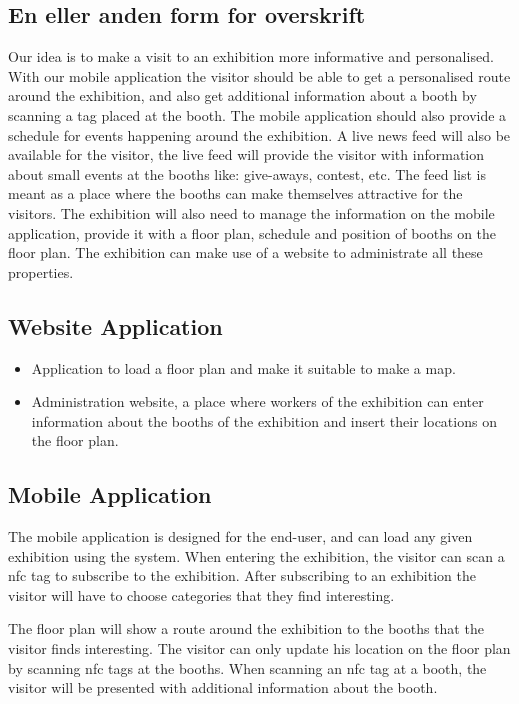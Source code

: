 \subsection*{En eller anden form for overskrift}

Our idea is to make a visit to an exhibition more informative and personalised.  With our mobile application the visitor should be able to get a personalised  route around the exhibition, and also get additional information about a booth by scanning a tag placed at the booth. The mobile application should also provide a schedule for events happening around the exhibition. A live news feed will also be available for the visitor, the live feed will provide the visitor with information about small events at the booths like: give-aways, contest, etc. The feed list is meant as a place where the booths can make themselves attractive for the visitors.
The exhibition will also need to manage the information on the mobile application, provide it with a floor plan, schedule and position of booths on the floor plan. The exhibition can make use of a website to administrate all these properties.

\subsection*{Website Application}
\begin{itemize}
\item Application to load a floor plan and make it suitable to make a map.
\item Administration website, a place where workers of the exhibition can enter information about the booths of the exhibition and insert their locations on the floor plan.
\end{itemize}
\subsection*{Mobile Application}

The mobile application is designed for the end-user, and can load any given exhibition using the system. When entering the exhibition, the visitor can scan a \ac{nfc} tag to subscribe to the exhibition. After subscribing to an exhibition the visitor will have to choose categories that they find interesting. 

The floor plan will show a route around the exhibition to the booths that the visitor finds interesting. The visitor can only update his location on the floor plan by scanning \ac{nfc} tags at the booths. When scanning an \ac{nfc} tag at a booth, the visitor will be presented with additional information about the booth. 

